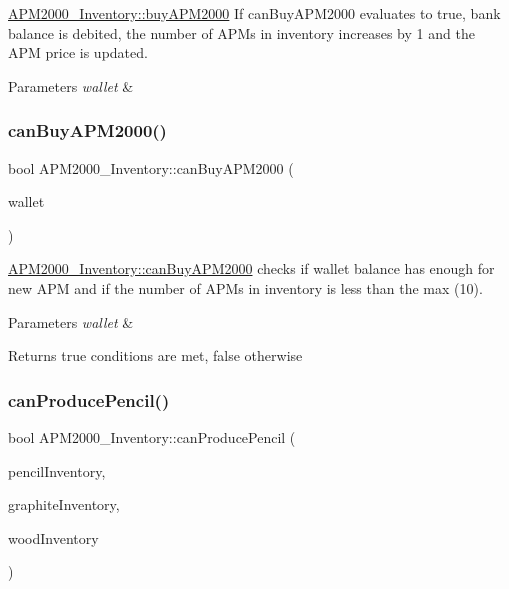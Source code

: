 \mbox{\hyperlink{classAPM2000__Inventory_a5f89890fced248efa0792e0ac062e9e2}{A\+P\+M2000\+\_\+\+Inventory\+::buy\+A\+P\+M2000}} If can\+Buy\+A\+P\+M2000 evaluates to true, bank balance is debited, the number of A\+P\+Ms in inventory increases by 1 and the A\+PM price is updated. 


\begin{DoxyParams}{Parameters}
{\em wallet} & \\
\hline
\end{DoxyParams}
\mbox{\label{classAPM2000__Inventory_a8edb69c3a8614e7b709605f59a3c409b}} 
\subsubsection{\texorpdfstring{canBuyAPM2000()}{canBuyAPM2000()}}
{\footnotesize\ttfamily bool A\+P\+M2000\+\_\+\+Inventory\+::can\+Buy\+A\+P\+M2000 (\begin{DoxyParamCaption}\item[{\mbox{\hyperlink{classWallet}{Wallet}} \&}]{wallet }\end{DoxyParamCaption})}



\mbox{\hyperlink{classAPM2000__Inventory_a8edb69c3a8614e7b709605f59a3c409b}{A\+P\+M2000\+\_\+\+Inventory\+::can\+Buy\+A\+P\+M2000}} checks if wallet balance has enough for new A\+PM and if the number of A\+P\+Ms in inventory is less than the max (10). 


\begin{DoxyParams}{Parameters}
{\em wallet} & \\
\hline
\end{DoxyParams}
\begin{DoxyReturn}{Returns}
true conditions are met, false otherwise 
\end{DoxyReturn}
\mbox{\label{classAPM2000__Inventory_a57eae269c4c67d3133175d6006373d2b}} 
\subsubsection{\texorpdfstring{canProducePencil()}{canProducePencil()}}
{\footnotesize\ttfamily bool A\+P\+M2000\+\_\+\+Inventory\+::can\+Produce\+Pencil (\begin{DoxyParamCaption}\item[{\mbox{\hyperlink{classPencil__Inventory}{Pencil\+\_\+\+Inventory}} \&}]{pencil\+Inventory,  }\item[{\mbox{\hyperlink{classGraphite__Inventory}{Graphite\+\_\+\+Inventory}} \&}]{graphite\+Inventory,  }\item[{\mbox{\hyperlink{classWood__Inventory}{Wood\+\_\+\+Inventory}} \&}]{wood\+Inventory }\end{DoxyParamCaption})}



